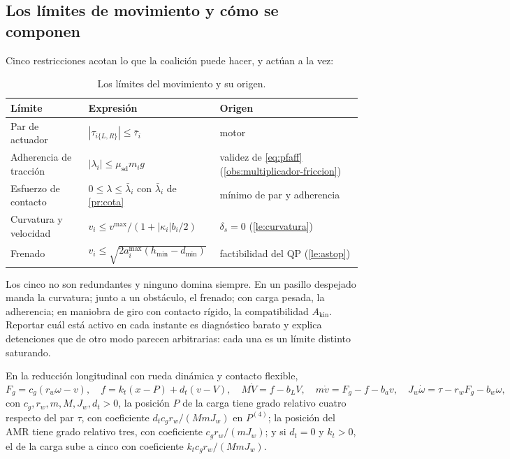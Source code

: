 \figCarga

\subsection{Los límites de movimiento y cómo se componen}

Cinco restricciones acotan lo que la coalición puede hacer, y actúan a la vez:

\begin{table}[!ht]
\centering\small
\caption{Los límites del movimiento y su origen.}
\label{tab:limites}
\begin{tabularx}{\textwidth}{@{}p{3.5cm}p{4.6cm}X@{}}
\toprule
Límite & Expresión & Origen \\
\midrule
Par de actuador & $|\tau_{i\{L,R\}}|\le\bar\tau_i$ & motor \\
Adherencia de tracción & $|\lambda_i|\le\mu_{\mathrm{sd}}m_ig$
  & validez de \eqref{eq:pfaff} (\cref{obs:multiplicador-friccion}) \\
Esfuerzo de contacto & $0\le\lambda\le\bar\lambda_i$ con
  $\bar\lambda_i$ de \cref{pr:cota} & mínimo de par y adherencia \\
Curvatura y velocidad & $v_i\le v^{\max}/(1+|\kappa_i|b_i/2)$
  & $\delta_s=0$ (\cref{le:curvatura}) \\
Frenado & $v_i\le\sqrt{2a^{\max}_i(h_{\min}-d_{\min})}$
  & factibilidad del QP (\cref{le:astop}) \\
\bottomrule
\end{tabularx}
\end{table}

\begin{observacion}
\label{obs:limite-activo}
Los cinco no son redundantes y ninguno domina siempre. En un pasillo despejado
manda la curvatura; junto a un obstáculo, el frenado; con carga pesada, la
adherencia; en maniobra de giro con contacto rígido, la compatibilidad
$A_{\mathrm{kin}}$. Reportar cuál está activo en cada instante es diagnóstico
barato y explica detenciones que de otro modo parecen arbitrarias: cada una es
un límite distinto saturando.
\end{observacion}

\begin{teorema}
\label{th:grado-relativo-rueda}
En la reducción longitudinal con rueda dinámica y contacto flexible,
\[
  F_g=c_g(r_w\omega-v),\quad f=k_t(x-P)+d_t(v-V),\quad
  M\dot V=f-b_LV,\quad m\dot v=F_g-f-b_av,\quad J_w\dot\omega=\tau-r_wF_g-b_w\omega ,
\]
con $c_g,r_w,m,M,J_w,d_t>0$, la posición $P$ de la carga tiene grado relativo
cuatro respecto del par $\tau$, con coeficiente $d_tc_gr_w/(MmJ_w)$ en
$P^{(4)}$; la posición del AMR tiene grado relativo tres, con coeficiente
$c_gr_w/(mJ_w)$; y si $d_t=0$ y $k_t>0$, el de la carga sube a cinco con
coeficiente $k_tc_gr_w/(MmJ_w)$.
\end{teorema}

